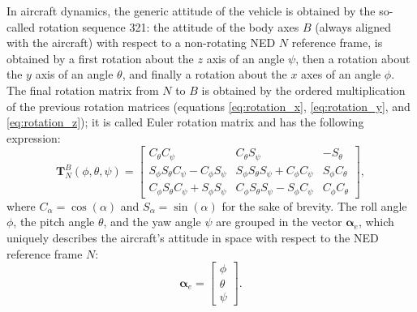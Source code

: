 In aircraft dynamics, the generic attitude of the vehicle is obtained by the so-called rotation sequence 321: the attitude of the body axes \(B\) (always aligned with the aircraft) with respect to a non-rotating NED \(N\) reference frame, is obtained by a first rotation about the \(z\) axis of an angle \(\psi\), then a rotation about the \(y\) axis of an angle \(\theta\), and finally a rotation about the \(x\) axes of an angle \(\phi\). The final rotation matrix from \(N\) to \(B\) is obtained by the ordered multiplication of the previous rotation matrices (equations \eqref{eq:rotation_x}, \eqref{eq:rotation_y}, and \eqref{eq:rotation_z}); it is called Euler rotation matrix and has the following expression:
\begin{equation}
    \mathbf{T}_{N}^{B}(\phi, \theta, \psi) = \begin{bmatrix} 
        C_{\theta}C_{\psi} & C_{\theta}S_{\psi} & -S_{\theta} \\ 
        S_{\phi}S_{\theta}C_{\psi} - C_{\phi}S_{\psi} & S_{\phi}S_{\theta}S_{\psi} + C_{\phi}C_{\psi} & S_{\phi}C_{\theta} \\ 
        C_{\phi}S_{\theta}C_{\psi} + S_{\phi}S_{\psi} & C_{\phi}S_{\theta}S_{\psi} - S_{\phi}C_{\psi} & C_{\phi}C_{\theta} 
    \end{bmatrix}, \label{eq:euler_rotation_matrix}
\end{equation}
where \(C_{\alpha} = \cos(\alpha)\) and \(S_{\alpha} = \sin(\alpha)\) for the sake of brevity.
The roll angle \(\phi\), the pitch angle \(\theta\), and the yaw angle \(\psi\) are grouped in the vector \(\boldsymbol{\alpha}_e\), which uniquely describes the aircraft’s attitude in space with respect to the NED reference frame \(N\):
\begin{equation}
    \boldsymbol{\alpha}_e = \begin{bmatrix} 
        \phi \\ 
        \theta \\ 
        \psi 
    \end{bmatrix}. \label{eq:euler_angles_vector}
\end{equation}

